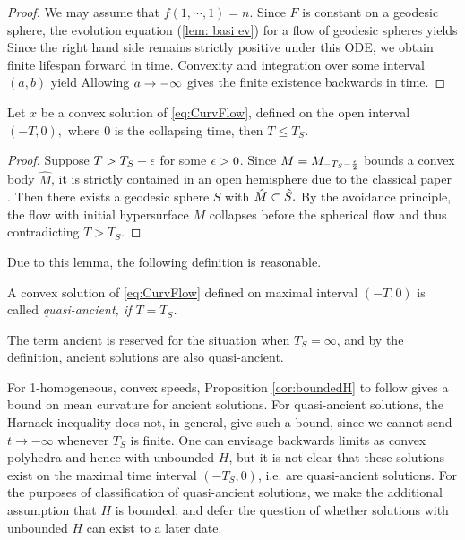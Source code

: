 \documentclass{amsart}
\begin{document}
\begin{proof}
We may assume that $f(1,\cdots,1)=n.$
Since $F$ is constant on a geodesic sphere, the evolution equation (\ref{lem: basi ev}) for a flow of geodesic spheres yields
Since the right hand side remains strictly positive under this ODE, we obtain finite lifespan forward in time.
Convexity and integration over some interval $(a,b)$ yield
Allowing $a\rightarrow-\infty$ gives the finite existence backwards in time.
\end{proof}

\begin{lemma}
Let $x$ be a convex solution of \eqref{eq:CurvFlow}, defined on the open interval $(-T,0),$ where $0$ is the collapsing time, then $T\leq T_S.$
\end{lemma}

\begin{proof}
Suppose $T>T_S+\epsilon$ for some $\epsilon>0$. Since $M=M_{-T_S-\frac{\epsilon}{2}}$ bounds a convex body $\hat{M}$, it is strictly contained in an open hemisphere due to the classical paper \cite{CarmoWarner:/1970}. Then there exists a geodesic sphere $S$ with $\hat{M}\subset\hat{S}.$ By the avoidance principle, the flow with initial hypersurface $M$ collapses before the spherical flow and thus contradicting $T>T_S$.
\end{proof}

Due to this lemma, the following definition is reasonable.

\begin{definition}
A convex solution of \eqref{eq:CurvFlow} defined on maximal interval $(-T,0)$ is called \it{quasi-ancient}, if $T=T_S$.
\end{definition}

The term ancient is reserved for the situation when \(T_S=\infty\), and by the definition, ancient solutions are also quasi-ancient.

For 1-homogeneous, convex speeds, Proposition \ref{cor:boundedH} to follow gives a bound on mean curvature for ancient solutions. For quasi-ancient solutions, the Harnack inequality does not, in general, give such a bound, since we cannot send \(t \to -\infty\) whenever \(T_S\) is finite. One can envisage backwards limits as convex polyhedra and hence with unbounded \(H\), but it is not clear that these solutions exist on the maximal time interval \((-T_S, 0)\), i.e. are quasi-ancient solutions. For the purposes of classification of quasi-ancient solutions, we make the additional assumption that \(H\) is bounded, and defer the question of whether solutions with unbounded \(H\) can exist to a later date.
\end{document}
